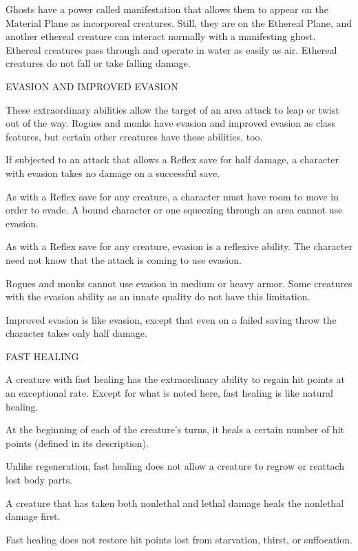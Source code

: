 \documentclass{article}
\begin{document}
Ghosts have a power called manifestation that allows them to appear on the Material 
Plane as incorporeal creatures. Still, they are on the Ethereal Plane, and another 
ethereal creature can interact normally with a manifesting ghost. Ethereal creatures 
pass through and operate in water as easily as air. Ethereal creatures do not fall 
or take falling damage. 

\vspace{12pt}
EVASION AND IMPROVED EVASION

These extraordinary abilities allow the target of an area attack to leap or twist 
out of the way. Rogues and monks have evasion and improved evasion as class features, 
but certain other creatures have these abilities, too.

If subjected to an attack that allows a Reflex save for half damage, a character 
with evasion takes no damage on a successful save. 

As with a Reflex save for any creature, a character must have room to move in order 
to evade. A bound character or one squeezing through an area cannot use evasion.

As with a Reflex save for any creature, evasion is a reflexive ability. The character 
need not know that the attack is coming to use evasion.

Rogues and monks cannot use evasion in medium or heavy armor. Some creatures with 
the evasion ability as an innate quality do not have this limitation.

Improved evasion is like evasion, except that even on a failed saving throw the 
character takes only half damage.

\vspace{12pt}
FAST HEALING

A creature with fast healing has the extraordinary ability to regain hit points 
at an exceptional rate. Except for what is noted here, fast healing is like natural 
healing. 

At the beginning of each of the creature's turns, it heals a certain number of 
hit points (defined in its description).

Unlike regeneration, fast healing does not allow a creature to regrow or reattach 
lost body parts.

A creature that has taken both nonlethal and lethal damage heals the nonlethal 
damage first.

Fast healing does not restore hit points lost from starvation, thirst, or suffocation.
\end{document}
